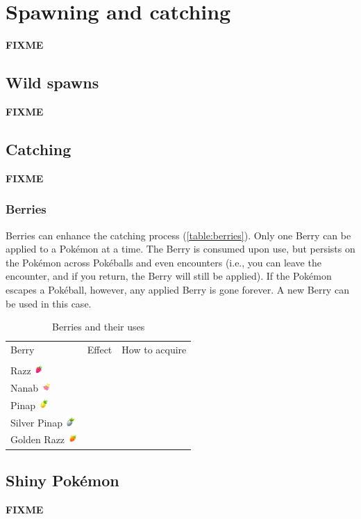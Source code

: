 \chapter{Spawning and catching}
\label{chap:spawn}
\textbf{FIXME}

\section{Wild spawns}
\label{sec:spawns}
\textbf{FIXME}

\section{Catching}
\label{sec:catch}
\textbf{FIXME}

\subsection{Berries}
Berries can enhance the catching process (\autoref{table:berries}).
Only one Berry can be applied to a Pokémon at a time.
The Berry is consumed upon use, but persists on the Pokémon across Pokéballs
  and even encounters (i.e., you can leave the encounter, and if you return,
  the Berry will still be applied).
If the Pokémon escapes a Pokéball, however, any applied Berry is gone forever.
A new Berry can be used in this case.

\begin{table}[ht]
\begin{center}
\begin{tabular}{lll}
Berry & Effect & How to acquire \\
\Midrule\\
Razz \includegraphics[width=1em]{images/razz.png} & & \\
Nanab \includegraphics[width=1em]{images/nanab.png} & & \\
Pinap \includegraphics[width=1em]{images/pinap.png} & & \\
Silver Pinap \includegraphics[width=1em]{images/silverpinap.png} & &\\
Golden Razz \includegraphics[width=1em]{images/goldenrazz.png} & & \\
\end{tabular}
\end{center}
\caption{Berries and their uses}
\label{table:berries}
\end{table}

\section{Shiny Pokémon}
\label{sec:shiny}
\textbf{FIXME}
